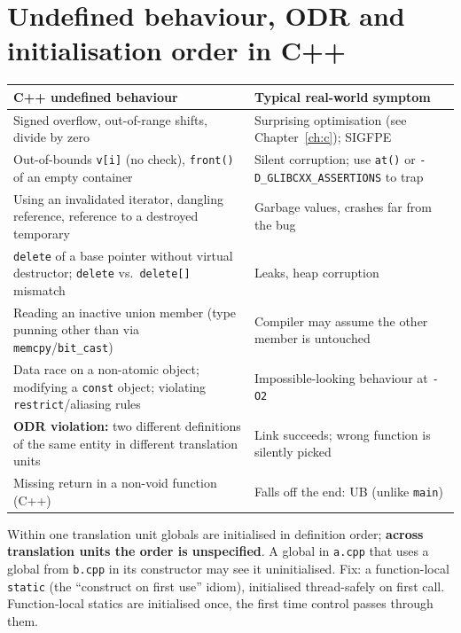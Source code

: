 \documentclass[10pt,a4paper,openany,oneside]{report}
\newcommand{\prio}[1]{\texorpdfstring{\ifcase#1\or{\color{gold}\ding{72}}\or{\color{gold}\ding{72}\ding{72}}\or{\color{gold}\ding{72}\ding{72}\ding{72}}\fi}{}}
\begin{document}
\section{Undefined behaviour, ODR and initialisation order in C++ \prio{3}}
\begin{center}\small
\begin{xltabular}{\textwidth}{@{}L{5.4cm}Y@{}}
\toprule
\textbf{C++ undefined behaviour} & \textbf{Typical real-world symptom}\\
\midrule\endhead
Signed overflow, out-of-range shifts, divide by zero & Surprising optimisation (see Chapter~\ref{ch:c}); SIGFPE\\
Out-of-bounds \texttt{v[i]} (no check), \texttt{front()} of an empty container & Silent corruption; use \texttt{at()} or \texttt{-D\_GLIBCXX\_ASSERTIONS} to trap\\
Using an invalidated iterator, dangling reference, reference to a destroyed temporary & Garbage values, crashes far from the bug\\
\texttt{delete} of a base pointer without virtual destructor; \texttt{delete} vs.\ \texttt{delete[]} mismatch & Leaks, heap corruption\\
Reading an inactive union member (type punning other than via \texttt{memcpy}/\texttt{bit\_cast}) & Compiler may assume the other member is untouched\\
Data race on a non-atomic object; modifying a \texttt{const} object; violating \texttt{restrict}/aliasing rules & Impossible-looking behaviour at \texttt{-O2}\\
\textbf{ODR violation:} two different definitions of the same entity in different translation units & Link succeeds; wrong function is silently picked\\
Missing return in a non-void function (C++) & Falls off the end: UB (unlike \texttt{main})\\
\bottomrule
\end{xltabular}
\end{center}
\begin{trapbox}
Within one translation unit globals are initialised in definition order; \textbf{across translation units the order is unspecified}. A global in \texttt{a.cpp} that uses a global from \texttt{b.cpp} in its constructor may see it uninitialised. Fix: a function-local \texttt{static} (the ``construct on first use'' idiom), initialised thread-safely on first call. Function-local statics are initialised once, the first time control passes through them.
\end{trapbox}
\end{document}
